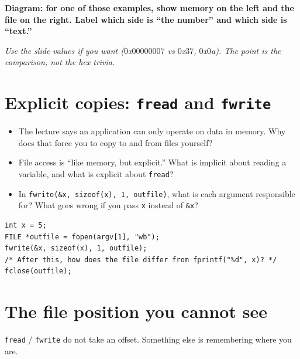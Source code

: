 \documentclass[12pt]{article}
\begin{document}
\noindent\textbf{Diagram: for one of those examples, show memory on the left and the file on the right. Label which side is ``the number'' and which side is ``text.''}
\begin{framed}
\begin{minipage}[t][0.35\textheight]{\textwidth}
\vspace{0.6em}
\textit{Use the slide values if you want ($0$x$00000007$ vs $0$x$37$, $0$x$0$a). The point is the comparison, not the hex trivia.}
\end{minipage}
\end{framed}

\vspace{1.2em}

\section{Explicit copies: \texttt{fread} and \texttt{fwrite}}

\begin{itemize}
  \item The lecture says an application can only operate on data in memory. Why does that force you to copy to and from files yourself?
  \vspace{2.2em}
  \item File access is ``like memory, but explicit.'' What is implicit about reading a variable, and what is explicit about \texttt{fread}?
  \vspace{2.4em}
  \item In \texttt{fwrite(\&x, sizeof(x), 1, outfile)}, what is each argument responsible for? What goes wrong if you pass \texttt{x} instead of \texttt{\&x}?
  \vspace{2.4em}
\end{itemize}

\begin{lstlisting}
int x = 5;
FILE *outfile = fopen(argv[1], "wb");
fwrite(&x, sizeof(x), 1, outfile);
/* After this, how does the file differ from fprintf("%d", x)? */
fclose(outfile);
\end{lstlisting}

\vspace{1.8em}

\section{The file position you cannot see}

\texttt{fread} / \texttt{fwrite} do not take an offset. Something else is remembering where you are.
\end{document}
